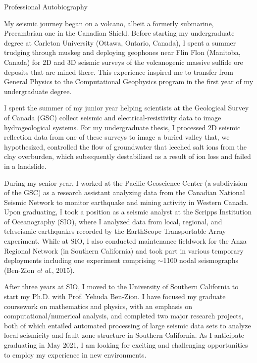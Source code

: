 \begin{rSection}{Professional Autobiography}
	\par
	My seismic journey began on a volcano, albeit a formerly submarine, Precambrian one in the Canadian Shield. Before starting my undergraduate degree at Carleton University (Ottawa, Ontario, Canada), I spent a summer trudging through muskeg and deploying geophones near Flin Flon (Manitoba, Canada) for 2D and 3D seismic surveys of the volcanogenic massive sulfide ore deposits that are mined there. This experience inspired me to transfer from General Physics to the Computational Geophysics program in the first year of my undergraduate degree.
	
	\par
	I spent the summer of my junior year helping scientists at the Geological Survey of Canada (GSC) collect seismic and electrical-resistivity data to image hydrogeological systems. For my undergraduate thesis, I processed 2D seismic reflection data from one of these surveys to image a buried valley that, we hypothesized, controlled the flow of groundwater that leeched salt ions from the clay overburden, which subsequently destabilized as a result of ion loss and failed in a landslide.
	
	\par
	During my senior year, I worked at the Pacific Geoscience Center (a subdivision of the GSC) as a research assistant analyzing data from the Canadian National Seismic Network to monitor earthquake and mining activity in Western Canada. Upon graduating, I took a position as a seismic analyst at the Scripps Institution of Oceanography (SIO), where I analyzed data from local, regional, and teleseismic earthquakes recorded by the EarthScope Transportable Array experiment. While at SIO, I also conducted maintenance fieldwork for the Anza Regional Network (in Southern California) and took part in various temporary deployments including one experiment comprising $\sim$1100 nodal seismographs (Ben-Zion \textit{et al}., 2015).
	
	\par
	After three years at SIO, I moved to the University of Southern California to start my Ph.D. with Prof. Yehuda Ben-Zion. I have focused my graduate coursework on mathematics and physics, with an emphasis on computational/numerical analysis, and completed two major research projects, both of which entailed automated processing of large seismic data sets to analyze local seismicity and fault-zone structure in Southern California. As I anticipate graduating in May 2021, I am looking for exciting and challenging opportunities to employ my experience in new environments.
	
\end{rSection}